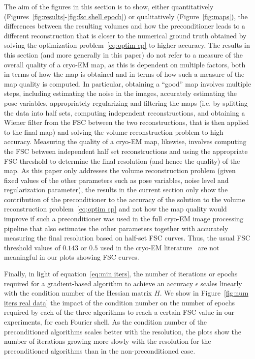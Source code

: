 \documentclass{article}
\begin{document}
The aim of the figures in this section is to show, either quantitatively (Figures~\ref{fig:results}-\ref{fig:fsc shell epoch}) or qualitatively (Figure~\ref{fig:maps}), the differences between the resulting volumes and how the preconditioner leads to a different reconstruction that is closer to the numerical ground truth obtained by solving the optimization problem~\eqref{eq:optim cp} to higher accuracy.
The results in this section (and more generally in this paper) do not refer to a measure of the overall quality of a cryo-EM map, as this is dependent on multiple factors, both in terms of how the map is obtained and in terms of how such a measure of the map quality is computed. In particular, obtaining a ``good'' map involves multiple steps, including estimating the noise in the images, accurately estimating the pose variables, appropriately regularizing and filtering the maps (i.e. by splitting the data into half sets, computing independent reconstructions, and obtaining a Wiener filter from the FSC between the two reconstructions, that is then applied to the final map) and solving the volume reconstruction problem to high accuracy. Measuring the quality of a cryo-EM map, likewise, involves computing the FSC between independent half set reconstructions and using the appropriate FSC threshold to determine the final resolution (and hence the quality) of the map.
As this paper only addresses the volume reconstruction problem (given fixed values of the other parameters such as pose variables, noise level and regularization parameter), the results in the current section only show the contribution of the preconditioner to the accuracy of the solution to the volume reconstruction problem~\eqref{eq:optim cp} and not how the map quality would improve if such a preconditioner was used in the full cryo-EM image processing pipeline that also estimates the other parameters together with accurately measuring the final resolution based on half-set FSC curves. 
Thus, the usual FSC threshold values of $0.143$ or $0.5$ used in the cryo-EM literature~\cite{rosenthal_optimal_2003} are not meaningful in our plots showing FSC curves.


Finally, in light of equation~\eqref{eq:min iters}, the number of iterations
or epochs required for a gradient-based algorithm to achieve an accuracy $\epsilon$
scales linearly with the condition number of the Hessian matrix $H$. 
We show in Figure~\ref{fig:num iters real data} the impact of the condition number
on the number of epochs required by each of the three algorithms to reach 
a certain FSC value in our experiments, for each Fourier shell. As the condition
number of the preconditioned algorithms scales better with the resolution, the 
plots show the number of iterations growing more slowly with the resolution 
for the preconditioned algorithms than in the non-preconditioned case.
\end{document}
